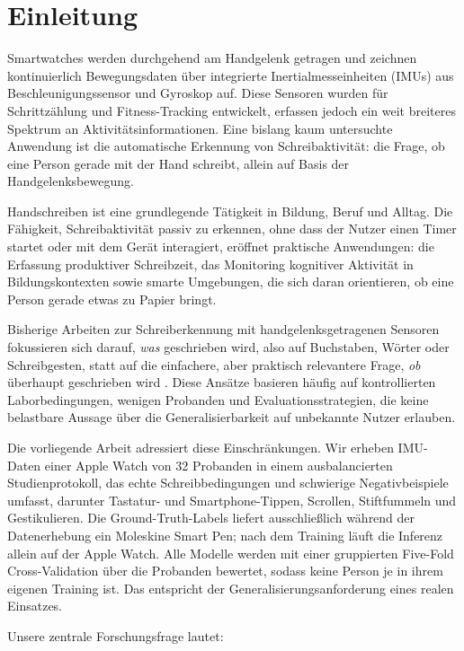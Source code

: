 \section{Einleitung}
\label{sec:introduction}

Smartwatches werden durchgehend am Handgelenk getragen und zeichnen kontinuierlich Bewegungsdaten über integrierte Inertialmesseinheiten (IMUs) aus Beschleunigungssensor und Gyroskop auf. Diese Sensoren wurden für Schrittzählung und Fitness-Tracking entwickelt, erfassen jedoch ein weit breiteres Spektrum an Aktivitätsinformationen. Eine bislang kaum untersuchte Anwendung ist die automatische Erkennung von Schreibaktivität: die Frage, ob eine Person gerade mit der Hand schreibt, allein auf Basis der Handgelenksbewegung.

Handschreiben ist eine grundlegende Tätigkeit in Bildung, Beruf und Alltag. Die Fähigkeit, Schreibaktivität passiv zu erkennen, ohne dass der Nutzer einen Timer startet oder mit dem Gerät interagiert, eröffnet praktische Anwendungen: die Erfassung produktiver Schreibzeit, das Monitoring kognitiver Aktivität in Bildungskontexten sowie smarte Umgebungen, die sich daran orientieren, ob eine Person gerade etwas zu Papier bringt.

Bisherige Arbeiten zur Schreiberkennung mit handgelenksgetragenen Sensoren fokussieren sich darauf, \textit{was} geschrieben wird, also auf Buchstaben, Wörter oder Schreibgesten, statt auf die einfachere, aber praktisch relevantere Frage, \textit{ob} überhaupt geschrieben wird \cite{soubam2023, xiamotionhacker2018}. Diese Ansätze basieren häufig auf kontrollierten Laborbedingungen, wenigen Probanden und Evaluationsstrategien, die keine belastbare Aussage über die Generalisierbarkeit auf unbekannte Nutzer erlauben.

Die vorliegende Arbeit adressiert diese Einschränkungen. Wir erheben IMU-Daten einer Apple Watch von 32 Probanden in einem ausbalancierten Studienprotokoll, das echte Schreibbedingungen und schwierige Negativbeispiele umfasst, darunter Tastatur- und Smartphone-Tippen, Scrollen, Stiftfummeln und Gestikulieren. Die Ground-Truth-Labels liefert ausschließlich während der Datenerhebung ein Moleskine Smart Pen; nach dem Training läuft die Inferenz allein auf der Apple Watch. Alle Modelle werden mit einer gruppierten Five-Fold Cross-Validation über die Probanden bewertet, sodass keine Person je in ihrem eigenen Training ist. Das entspricht der Generalisierungsanforderung eines realen Einsatzes.

Unsere zentrale Forschungsfrage lautet:

